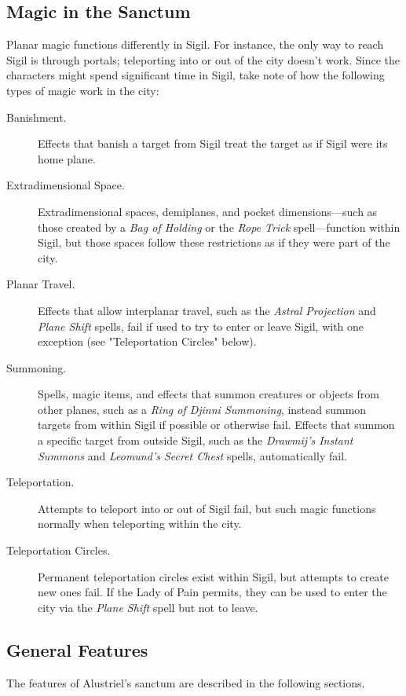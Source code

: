 \documentclass[10pt,a4paper,twoside,bg=print,twocolumn,openany,nodeprecatedcode]{dndbook}
\begin{document}
\subsection{Magic in the Sanctum}
Planar magic functions differently in Sigil. For instance, the only way to reach Sigil is through portals; teleporting into or out of the city doesn't work. Since the characters might spend significant time in Sigil, take note of how the following types of magic work in the city:


\begin{description}
\item[Banishment.]
Effects that banish a target from Sigil treat the target as if Sigil were its home plane.
\item[Extradimensional Space.]
Extradimensional spaces, demiplanes, and pocket dimensions—such as those created by a \textit{Bag of Holding} or the \textit{Rope Trick} spell—function within Sigil, but those spaces follow these restrictions as if they were part of the city.
\item[Planar Travel.]
Effects that allow interplanar travel, such as the \textit{Astral Projection} and \textit{Plane Shift} spells, fail if used to try to enter or leave Sigil, with one exception (see "Teleportation Circles" below).
\item[Summoning.]
Spells, magic items, and effects that summon creatures or objects from other planes, such as a \textit{Ring of Djinni Summoning}, instead summon targets from within Sigil if possible or otherwise fail. Effects that summon a specific target from outside Sigil, such as the \textit{Drawmij's Instant Summons} and \textit{Leomund's Secret Chest} spells, automatically fail.
\item[Teleportation.]
Attempts to teleport into or out of Sigil fail, but such magic functions normally when teleporting within the city.
\item[Teleportation Circles.]
Permanent teleportation circles exist within Sigil, but attempts to create new ones fail. If the Lady of Pain permits, they can be used to enter the city via the \textit{Plane Shift} spell but not to leave.
\end{description}

\subsection{General Features}
The features of Alustriel's sanctum are described in the following sections.
\end{document}
